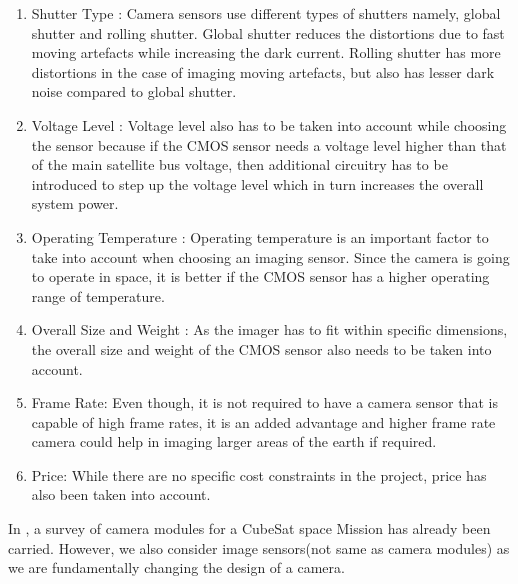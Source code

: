 \begin{enumerate}
\item Shutter Type : Camera sensors use different types of shutters namely, global shutter and rolling shutter. Global shutter reduces the distortions due to fast moving artefacts while increasing the dark current. Rolling shutter has more distortions in the case of imaging moving artefacts, but also has lesser dark noise compared to global shutter. 

\item Voltage Level : Voltage level also has to be taken into account while choosing the sensor because if the CMOS sensor needs a voltage level higher than that of the main satellite bus voltage, then additional circuitry has to be introduced to step up the voltage level which in turn increases the overall system power.  

\item Operating Temperature : Operating temperature is an important factor to take into account when choosing an imaging sensor. Since the camera is going to operate in space, it is better if the CMOS sensor has a higher operating range of temperature. 

\item Overall Size and Weight : As the imager has to fit within specific dimensions, the overall size and weight of the CMOS sensor also needs to be taken into account.

\item Frame Rate: Even though, it is not required to have a camera sensor that is capable of high frame rates, it is an added advantage and higher frame rate camera could help in imaging larger areas of the earth if required. 
\item Price: While there are no specific cost constraints in the project, price has also been taken into account.
\end{enumerate}

In \cite{surveyCamMod}, a survey of camera modules for a CubeSat space Mission has already been carried. However, we also consider image sensors(not same as camera modules) as we are fundamentally changing the design of a camera. 

